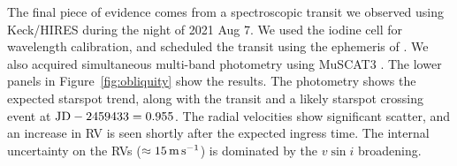 \documentclass[12pt,modern,twocolumn,tighten]{aastex63}
\begin{document}
The final piece of evidence comes from a spectroscopic transit we
observed using Keck/HIRES during the night of 2021 Aug 7.  We
used the iodine cell for wavelength calibration, and scheduled the
transit using the ephemeris of \citet{holczer_transit_2016}.  We also acquired
simultaneous multi-band photometry using MuSCAT3 \citep{Narita_2020}.
The lower panels in Figure~\ref{fig:obliquity} show the results.  The
photometry shows the expected starspot trend, along with the transit
and a likely starspot crossing event at ${\rm JD} - 2459433 = 0.955$.
The radial velocities show significant scatter, and an
increase in RV is seen shortly after the expected ingress time.  The
internal uncertainty on the RVs ($\approx 15\,{\rm m\,s}^{-1}$) is
dominated by the $v\sin i$ broadening.

%
%
%
% 
\end{document}

